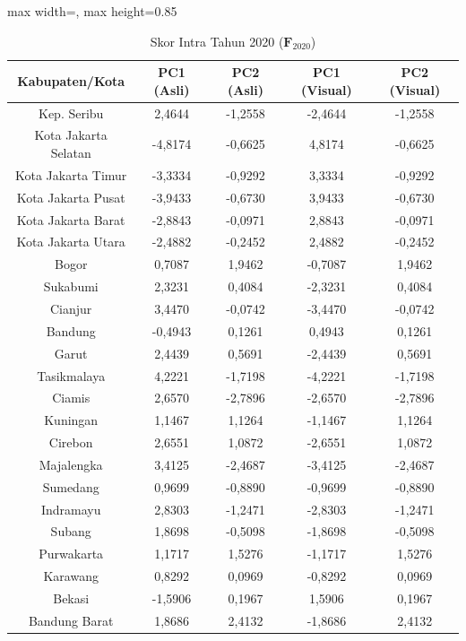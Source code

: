 \begin{table}[H]
\centering
\caption{Skor Intra Tahun 2020 ($\mathbf{F}_{2020}$)} \label{tab:app2skor_intra_2020}
\begin{adjustbox}{max width=\textwidth, max height=0.85\textheight}
\begin{tabular}{|c|c|c|c|c|}
\hline
\textbf{Kabupaten/Kota} & \textbf{PC1 (Asli)} & \textbf{PC2 (Asli)} & \textbf{PC1 (Visual)} & \textbf{PC2 (Visual)} \\
\hline
Kep. Seribu & 2,4644 & -1,2558 & -2,4644 & -1,2558 \\
Kota Jakarta Selatan & -4,8174 & -0,6625 & 4,8174 & -0,6625 \\
Kota Jakarta Timur & -3,3334 & -0,9292 & 3,3334 & -0,9292 \\
Kota Jakarta Pusat & -3,9433 & -0,6730 & 3,9433 & -0,6730 \\
Kota Jakarta Barat & -2,8843 & -0,0971 & 2,8843 & -0,0971 \\
Kota Jakarta Utara & -2,4882 & -0,2452 & 2,4882 & -0,2452 \\
Bogor & 0,7087 & 1,9462 & -0,7087 & 1,9462 \\
Sukabumi & 2,3231 & 0,4084 & -2,3231 & 0,4084 \\
Cianjur & 3,4470 & -0,0742 & -3,4470 & -0,0742 \\
Bandung & -0,4943 & 0,1261 & 0,4943 & 0,1261 \\
Garut & 2,4439 & 0,5691 & -2,4439 & 0,5691 \\
Tasikmalaya & 4,2221 & -1,7198 & -4,2221 & -1,7198 \\
Ciamis & 2,6570 & -2,7896 & -2,6570 & -2,7896 \\
Kuningan & 1,1467 & 1,1264 & -1,1467 & 1,1264 \\
Cirebon & 2,6551 & 1,0872 & -2,6551 & 1,0872 \\
Majalengka & 3,4125 & -2,4687 & -3,4125 & -2,4687 \\
Sumedang & 0,9699 & -0,8890 & -0,9699 & -0,8890 \\
Indramayu & 2,8303 & -1,2471 & -2,8303 & -1,2471 \\
Subang & 1,8698 & -0,5098 & -1,8698 & -0,5098 \\
Purwakarta & 1,1717 & 1,5276 & -1,1717 & 1,5276 \\
Karawang & 0,8292 & 0,0969 & -0,8292 & 0,0969 \\
Bekasi & -1,5906 & 0,1967 & 1,5906 & 0,1967 \\
Bandung Barat & 1,8686 & 2,4132 & -1,8686 & 2,4132 \\

\end{tabular}
\end{adjustbox}
\end{table}
